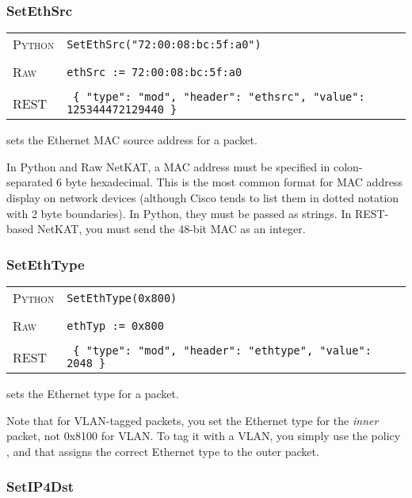 \subsubsection{SetEthSrc}

\bigskip
\begin{tabularx}{\linewidth}{lX}
\textsc{Python}   & \texttt{SetEthSrc("72:00:08:bc:5f:a0")} \\ \\
\textsc{Raw}    & \texttt{ethSrc := 72:00:08:bc:5f:a0}     \\ \\
\textsc{REST} & \texttt{ \{ "type": "mod", "header": "ethsrc", "value": 125344472129440 \} }
\end{tabularx}

 sets the Ethernet MAC source address for a packet.    

In Python and Raw NetKAT, a MAC address must be specified in colon-separated 6 byte hexadecimal.  This is the most common format
for MAC address display on network devices (although Cisco tends to list them in dotted notation with 2 byte
boundaries).  In Python, they must be passed as strings.  In REST-based NetKAT, you must send the 48-bit MAC as 
an integer.  

\subsubsection{SetEthType}

\bigskip
\begin{tabularx}{\linewidth}{lX}
\textsc{Python}   & \texttt{SetEthType(0x800)} \\ \\
\textsc{Raw}    & \texttt{ethTyp := 0x800}     \\ \\
\textsc{REST} & \texttt{ \{ "type": "mod", "header": "ethtype", "value": 2048 \} }
\end{tabularx}

 sets the Ethernet type for a packet.    

Note that for VLAN-tagged packets, you set the Ethernet type for the \emph{inner} packet, not 0x8100
for VLAN.  To tag it with a VLAN, you simply use the policy , and that assigns the
correct Ethernet type to the outer packet.  

\subsubsection{SetIP4Dst}

